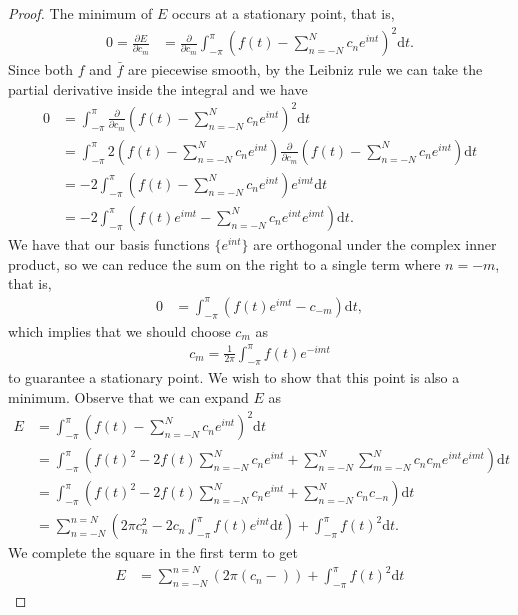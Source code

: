 \documentclass[10pt]{article}
\begin{document}
\begin{proof}
    The minimum of \(E\) occurs at a stationary point, that is,
    \begin{align*}
        0 = \frac{\partial E}{\partial c_m} &= \frac{\partial}{\partial c_m} \int_{-\pi}^\pi \left(f(t) - \sum_{n=-N}^{N} c_ne^{int}\right)^2 \mathrm{d}t.
    \end{align*} Since both \(f\) and \(\bar{f}\) are piecewise smooth, by the Leibniz rule we can take the partial derivative inside the integral and we have \begin{align*}
        0 &= \int_{-\pi}^\pi \frac{\partial}{\partial c_m} \left(f(t) - \sum_{n=-N}^{N} c_ne^{int}\right)^2 \mathrm{d}t \\
          &= \int_{-\pi}^\pi 2\left(f(t) - \sum_{n=-N}^{N} c_ne^{int}\right) \frac{\partial}{\partial c_m}\left(f(t) - \sum_{n=-N}^{N} c_ne^{int}\right)  \mathrm{d}t \\
          &= -2\int_{-\pi}^\pi \left(f(t) - \sum_{n=-N}^{N} c_ne^{int}\right) e^{imt} \mathrm{d}t \\
          &= -2\int_{-\pi}^\pi \left(f(t)e^{imt} - \sum_{n=-N}^{N} c_ne^{int}e^{imt}\right) \mathrm{d}t.
    \end{align*} We have that our basis functions \(\{e^{int}\}\) are orthogonal under the complex inner product, so we can reduce the sum on the right to a single term where \(n=-m\), that is, \begin{align*}
        0 &= \int_{-\pi}^\pi \left(f(t)e^{imt} - c_{-m}\right) \mathrm{d}t,
    \end{align*} which implies that we should choose \(c_m\) as \begin{align*}
        c_m = \frac{1}{2\pi} \int_{-\pi}^{\pi} f(t)e^{-imt}
    \end{align*} to guarantee a stationary point. We wish to show that this point is also a minimum. Observe that we can expand \(E\) as \begin{align*}
        E &= \int_{-\pi}^\pi \left(f(t) - \sum_{n=-N}^{N} c_ne^{int}\right)^2 \mathrm{d}t  \\
          &= \int_{-\pi}^\pi \left( f(t)^2 - 2f(t)\sum_{n=-N}^{N} c_ne^{int} + \sum_{n=-N}^{N} \sum_{m=-N}^{N} c_nc_me^{int}e^{imt}   \right) \mathrm{d}t \\
          &= \int_{-\pi}^\pi \left( f(t)^2 - 2f(t)\sum_{n=-N}^{N} c_ne^{int} + \sum_{n=-N}^{N} c_nc_{-n}   \right) \mathrm{d}t \\
          &= \sum_{n=-N}^{n=N} \left( 2\pi c_n^2 -2c_n \int_{-\pi }^{\pi } f(t)e^{int}\mathrm{d}t \right)  + \int_{-\pi}^{\pi} f(t)^2\mathrm{d}t.
    \end{align*} 
    We complete the square in the first term to get \begin{align*}
        E &= \sum_{n=-N}^{n=N} \left( 2\pi \left( c_n -  \right)  \right)  + \int_{-\pi}^{\pi} f(t)^2\mathrm{d}t
    \end{align*}
\end{proof}
\end{document}
